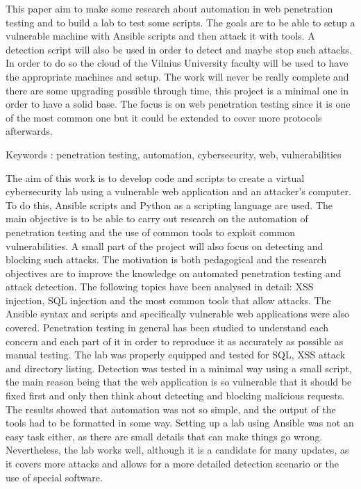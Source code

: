 This paper aim to make some research about automation in web penetration testing and to build a lab to test some scripts. The goals are to be able to setup a vulnerable machine with Ansible scripts and then attack it with tools. A detection script will also be used in order to detect and maybe stop such attacks.
In order to do so the cloud of the Vilnius University faculty will be used to have the appropriate machines and setup.
The work will never be really complete and there are some upgrading possible through time, this project is a minimal one in order to have a solid base.
The focus is on web penetration testing since it is one of the most common one but it could be extended to cover more protocols afterwards.

Keywords : penetration testing, automation, cybersecurity, web, vulnerabilities

\newpage


The aim of this work is to develop code and scripts to create a virtual cybersecurity lab using a vulnerable web application and an attacker's computer. To do this, Ansible scripts and Python as a scripting language are used. The main objective is to be able to carry out research on the automation of penetration testing and the use of common tools to exploit common vulnerabilities. A small part of the project will also focus on detecting and blocking such attacks. The motivation is both pedagogical and the research objectives are to improve the knowledge on automated penetration testing and attack detection. The following topics have been analysed in detail: XSS injection, SQL injection and the most common tools that allow attacks. The Ansible syntax and scripts and specifically vulnerable web applications were also covered. Penetration testing in general has been studied to understand each concern and each part of it in order to reproduce it as accurately as possible as manual testing. The lab was properly equipped and tested for SQL, XSS attack and directory listing. Detection was tested in a minimal way using a small script, the main reason being that the web application is so vulnerable that it should be fixed first and only then think about detecting and blocking malicious requests. The results showed that automation was not so simple, and the output of the tools had to be formatted in some way. Setting up a lab using Ansible was not an easy task either, as there are small details that can make things go wrong. Nevertheless, the lab works well, although it is a candidate for many updates, as it covers more attacks and allows for a more detailed detection scenario or the use of special software.